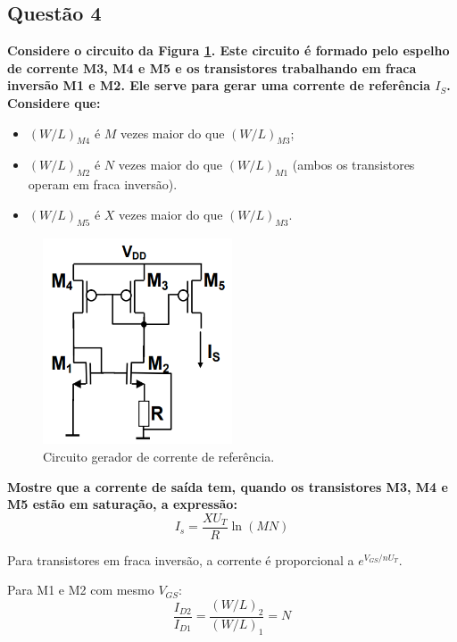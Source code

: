 ﻿\documentclass[12pt,a4paper]{article}
\begin{document}
\subsection*{Questão 4}
    	\textbf{Considere o circuito da Figura \ref{fig:gerador_corrente}. Este circuito é formado pelo espelho de corrente M3, M4 e M5 e os transistores trabalhando em fraca inversão M1 e M2. Ele serve para gerar uma corrente de referência $I_S$. Considere que:}
\begin{itemize}
    \item $(W/L)_{M4}$ é $M$ vezes maior do que $(W/L)_{M3}$;
    \item $(W/L)_{M2}$ é $N$ vezes maior do que $(W/L)_{M1}$ (ambos os transistores operam em fraca inversão).
    \item $(W/L)_{M5}$ é $X$ vezes maior do que $(W/L)_{M3}$.
\end{itemize}

\begin{figure}[H]
    \centering
    \includegraphics[width=0.5\textwidth]{gerador_corrente_referencia.png}
    \caption{Circuito gerador de corrente de referência.}
    \label{fig:gerador_corrente}
\end{figure}

\textbf{Mostre que a corrente de saída tem, quando os transistores M3, M4 e M5 estão em saturação, a expressão:}
\begin{equation}
I_s = \frac{XU_T}{R} \ln(MN)
\end{equation}



Para transistores em fraca inversão, a corrente é proporcional a $e^{V_{GS}/nU_T}$. 

Para M1 e M2 com mesmo $V_{GS}$:
\begin{equation*}
\frac{I_{D2}}{I_{D1}} = \frac{(W/L)_2}{(W/L)_1} = N
\end{equation*}
\end{document}
